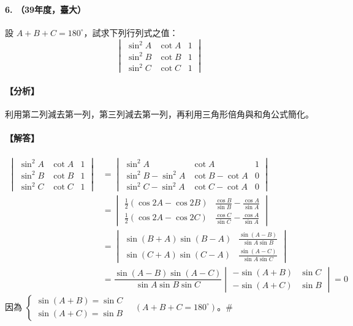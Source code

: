 \paragraph{6. （39年度，臺大）}
設 $A+B+C=180^\circ$，試求下列行列式之值：
\[ \begin{vmatrix}
\sin^2 A & \cot A & 1 \\
\sin^2 B & \cot B & 1 \\
\sin^2 C & \cot C & 1
\end{vmatrix} \]

\paragraph{【分析】}
利用第二列減去第一列，第三列減去第一列，再利用三角形倍角與和角公式簡化。

\paragraph{【解答】}
\begin{align*}
\begin{vmatrix}
\sin^2 A & \cot A & 1 \\
\sin^2 B & \cot B & 1 \\
\sin^2 C & \cot C & 1
\end{vmatrix}
&= \begin{vmatrix}
\sin^2 A & \cot A & 1 \\
\sin^2 B - \sin^2 A & \cot B - \cot A & 0 \\
\sin^2 C - \sin^2 A & \cot C - \cot A & 0
\end{vmatrix} \\
&= \begin{vmatrix}
\frac{1}{2}(\cos 2A - \cos 2B) & \frac{\cos B}{\sin B} - \frac{\cos A}{\sin A} \\
\frac{1}{2}(\cos 2A - \cos 2C) & \frac{\cos C}{\sin C} - \frac{\cos A}{\sin A}
\end{vmatrix} \\
&= \begin{vmatrix}
\sin(B+A)\sin(B-A) & \frac{\sin(A-B)}{\sin A \sin B} \\
\sin(C+A)\sin(C-A) & \frac{\sin(A-C)}{\sin A \sin C}
\end{vmatrix} \\
&= \dfrac{\sin(A-B)\sin(A-C)}{\sin A \sin B \sin C} \begin{vmatrix}
-\sin(A+B) & \sin C \\
-\sin(A+C) & \sin B
\end{vmatrix} = 0
\end{align*}
因為 $\begin{cases} \sin(A+B) = \sin C \\ \sin(A+C) = \sin B \end{cases} \quad (A+B+C=180^\circ)$。\hfill$\#$

